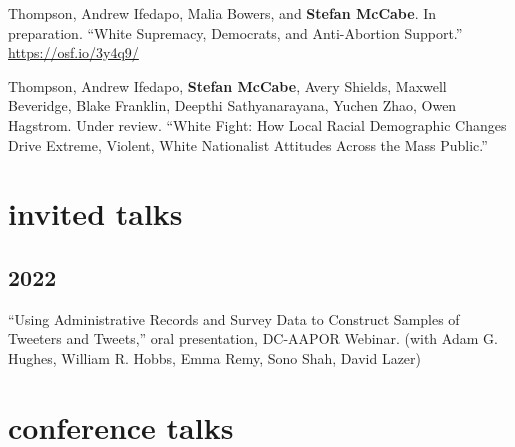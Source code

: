 \documentclass[11pt, letter]{article}
\begin{document}
\begin{hangparas}{.25in}{1}
Thompson, Andrew Ifedapo, Malia Bowers, and \textbf{Stefan McCabe}. In preparation. ``White Supremacy, Democrats, and Anti-Abortion Support.'' \href{https://osf.io/3y4q9/}{https://osf.io/3y4q9/} \vspace{2mm}

Thompson, Andrew Ifedapo, \textbf{Stefan McCabe}, Avery Shields, Maxwell Beveridge, Blake Franklin, Deepthi Sathyanarayana, Yuchen Zhao, Owen Hagstrom. Under review. ``White Fight: How Local Racial Demographic Changes Drive Extreme, Violent, White Nationalist Attitudes Across the Mass Public.''  \vspace{2mm}







\end{hangparas}

\section{invited talks}
\subsection{2022}
\begin{hangparas}{.25in}{1}
``Using Administrative Records and Survey Data to Construct Samples of Tweeters and Tweets,'' oral presentation, DC-AAPOR Webinar. (with Adam G. Hughes, William R. Hobbs, Emma Remy, Sono Shah, David Lazer) \vspace{2mm}
\end{hangparas}

\vspace{2mm}
\section{conference talks}
\end{document}
